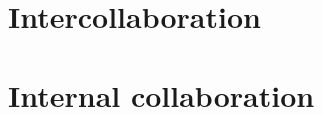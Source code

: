 \chapter{Intercollaboration}\label{CAP:Intercollaboration}

\chapter{Internal collaboration}\label{CAP:InternalCollaboration}
